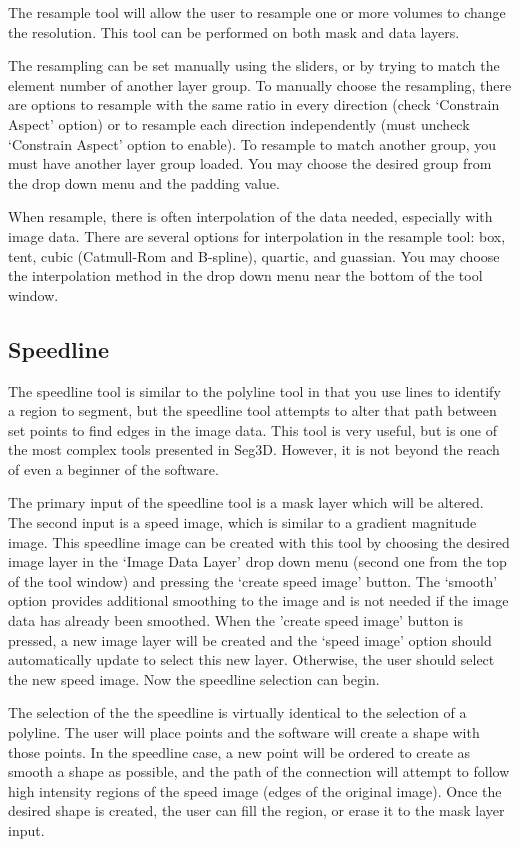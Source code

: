 \documentclass[fleqn,11pt,openany]{book}
\begin{document}
The resample tool will allow the user to resample one or more volumes to change the resolution.  This tool can be performed on both mask and data layers.  

The resampling can be set manually using the sliders, or by trying to match the element number of another layer group.  To manually choose the resampling, there are options to resample with the same ratio in every direction (check `Constrain Aspect' option) or to resample each direction independently (must uncheck `Constrain Aspect' option to enable).  To resample to match another group, you must have another layer group loaded.  You may choose the desired group from the drop down menu and the padding value.  

When resample, there is often interpolation of the data needed, especially with image data.  There are several options for interpolation in the resample tool: box, tent, cubic (Catmull-Rom and B-spline), quartic, and guassian.  You may choose the interpolation method in the drop down menu near the bottom of  the tool window.  

\subsection{Speedline}

The speedline tool is similar to the polyline tool in that you use lines to identify a region to segment, but the speedline tool attempts to alter that path between set points to find edges in the image data.  This tool is very useful, but is one of the most complex tools presented in Seg3D.  However, it is not beyond the reach of even a beginner of the software. 

The primary input of the speedline tool is a mask layer which will be altered.  The second input is a speed image, which is similar to a gradient magnitude image.  This speedline image can be created with this tool by choosing the desired image layer in the `Image Data Layer' drop down menu (second one from the top of the tool window) and pressing the `create speed image' button.  The `smooth' option provides additional smoothing to the image and is not needed if the image data has already been smoothed.  When the 'create speed image' button is pressed, a new image layer will be created and the `speed image' option should automatically update to select this new layer.  Otherwise, the user should select the new speed image.  Now the speedline selection can begin.

The selection of the the speedline is virtually identical to the selection of a polyline.  The user will place points and the software will create a shape with those points.  In the speedline case, a new point will be ordered to create as smooth a shape as possible, and the path of the connection will attempt to follow high intensity regions of the speed image (edges of the original image).  Once the desired shape is created, the user can fill the region, or erase it to the mask layer input.  
\end{document}
